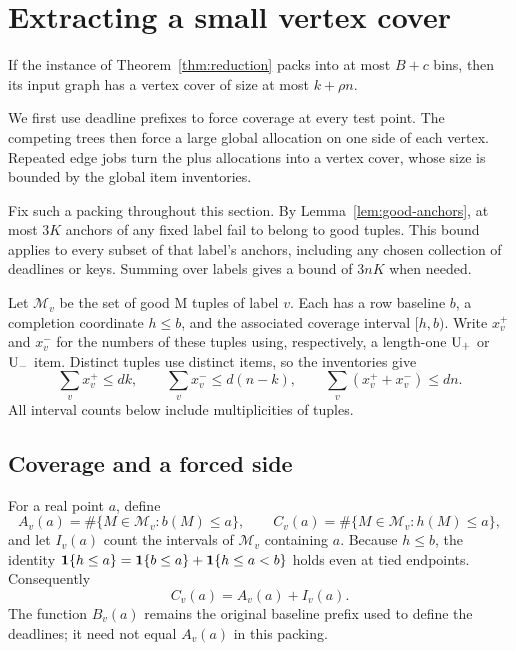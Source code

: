 \section{Extracting a small vertex cover}\label{sec:soundness}

\begin{proposition}[Soundness]\label{prop:soundness}
If the instance of Theorem~\ref{thm:reduction} packs into at most
\(B+c\) bins, then its input graph has a vertex cover of size at most
\(k+\rho n\).
\end{proposition}

We first use deadline prefixes to force coverage at every test point.
The competing trees then force a large global allocation on one side
of each vertex. Repeated edge jobs turn the plus allocations into a
vertex cover, whose size is bounded by the global item inventories.

Fix such a packing throughout this section.  By
Lemma~\ref{lem:good-anchors}, at most \(3K\) anchors of any fixed label
fail to belong to good tuples.  This bound applies to every subset of
that label's anchors, including any chosen collection of deadlines or
keys.  Summing over labels gives a bound of \(3nK\) when needed.

Let \(\mathcal M_v\) be the set of good \(\mathrm M\) tuples of label
\(v\).  Each has a row baseline \(b\), a completion coordinate \(h\le b\),
and the associated coverage interval \([h,b)\).
Write \(x_v^+\) and \(x_v^-\) for the numbers of these tuples using,
respectively, a length-one \(\mathrm{U}_{+}\) or \(\mathrm{U}_{-}\) item.  Distinct tuples
use distinct items, so the inventories give
\begin{equation}\label{eq:sound-global-budgets}
 \sum_v x_v^+\le dk,\qquad
 \sum_v x_v^-\le d(n-k),\qquad
 \sum_v(x_v^++x_v^-)\le dn.
\end{equation}
All interval counts below include multiplicities of tuples.

\subsection{Coverage and a forced side}

For a real point \(a\), define
\[
 A_v(a)=\#\{M\in\mathcal M_v:b(M)\le a\},\qquad
 C_v(a)=\#\{M\in\mathcal M_v:h(M)\le a\},
\]
and let \(I_v(a)\) count the intervals of \(\mathcal M_v\) containing
\(a\).  Because \(h\le b\), the identity
\(\mathbf{1}\{h\le a\}=\mathbf{1}\{b\le a\}+\mathbf{1}\{h\le a<b\}\)
holds even at tied endpoints.  Consequently
\begin{equation}\label{eq:sound-prefix-decomposition}
 C_v(a)=A_v(a)+I_v(a).
\end{equation}
The function \(B_v(a)\) remains the original baseline prefix used to
define the deadlines; it need not equal \(A_v(a)\) in this packing.


